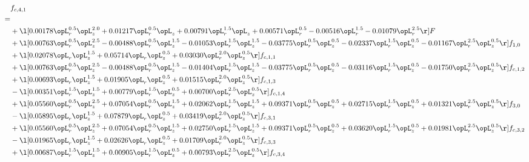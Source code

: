 \begin{alignat}{2} 
\label{eq:f_41_1} 
& f_{c,4,1} \nonumber \\ 
 = \\ 
& + \l[  0.00178 \opL_r^{0.5} \opL_z^{2.0} +  0.01217 \opL_r^{0.5} \opL_z +  0.00791 \opL_r^{1.5} \opL_z +  0.00571 \opL_r^{0.5}   -0.00516 \opL_r^{1.5}   -0.01079 \opL_r^{2.5}  \r] F \nonumber \\ 
& + \l[  0.00763 \opL_r^{0.5} \opL_z^{2.5}   -0.00488 \opL_r^{0.5} \opL_z^{1.5}   -0.01053 \opL_r^{1.5} \opL_z^{1.5}   -0.03775 \opL_r^{0.5} \opL_z^{0.5}   -0.02337 \opL_r^{1.5} \opL_z^{0.5}   -0.01167 \opL_r^{2.5} \opL_z^{0.5}  \r] f_{1,0} \nonumber \\ 
& + \l[  0.02078 \opL_r \opL_z^{1.5} +  0.05714 \opL_r \opL_z^{0.5} +  0.03030 \opL_r^{2.0} \opL_z^{0.5}  \r] f_{c,1,1} \nonumber \\ 
& + \l[  0.00763 \opL_r^{0.5} \opL_z^{2.5}   -0.00488 \opL_r^{0.5} \opL_z^{1.5}   -0.01404 \opL_r^{1.5} \opL_z^{1.5}   -0.03775 \opL_r^{0.5} \opL_z^{0.5}   -0.03116 \opL_r^{1.5} \opL_z^{0.5}   -0.01750 \opL_r^{2.5} \opL_z^{0.5}  \r] f_{c,1,2} \nonumber \\ 
& + \l[  0.00693 \opL_r \opL_z^{1.5} +  0.01905 \opL_r \opL_z^{0.5} +  0.01515 \opL_r^{2.0} \opL_z^{0.5}  \r] f_{c,1,3} \nonumber \\ 
& - \l[  0.00351 \opL_r^{1.5} \opL_z^{1.5} +  0.00779 \opL_r^{1.5} \opL_z^{0.5} +  0.00700 \opL_r^{2.5} \opL_z^{0.5}  \r] f_{c,1,4} \nonumber \\ 
& + \l[  0.05560 \opL_r^{0.5} \opL_z^{2.5} +  0.07054 \opL_r^{0.5} \opL_z^{1.5} +  0.02062 \opL_r^{1.5} \opL_z^{1.5} +  0.09371 \opL_r^{0.5} \opL_z^{0.5} +  0.02715 \opL_r^{1.5} \opL_z^{0.5} +  0.01321 \opL_r^{2.5} \opL_z^{0.5}  \r] f_{3,0} \nonumber \\ 
& - \l[  0.05895 \opL_r \opL_z^{1.5} +  0.07879 \opL_r \opL_z^{0.5} +  0.03419 \opL_r^{2.0} \opL_z^{0.5}  \r] f_{c,3,1} \nonumber \\ 
& + \l[  0.05560 \opL_r^{0.5} \opL_z^{2.5} +  0.07054 \opL_r^{0.5} \opL_z^{1.5} +  0.02750 \opL_r^{1.5} \opL_z^{1.5} +  0.09371 \opL_r^{0.5} \opL_z^{0.5} +  0.03620 \opL_r^{1.5} \opL_z^{0.5} +  0.01981 \opL_r^{2.5} \opL_z^{0.5}  \r] f_{c,3,2} \nonumber \\ 
& - \l[  0.01965 \opL_r \opL_z^{1.5} +  0.02626 \opL_r \opL_z^{0.5} +  0.01709 \opL_r^{2.0} \opL_z^{0.5}  \r] f_{c,3,3} \nonumber \\ 
& + \l[  0.00687 \opL_r^{1.5} \opL_z^{1.5} +  0.00905 \opL_r^{1.5} \opL_z^{0.5} +  0.00793 \opL_r^{2.5} \opL_z^{0.5}  \r] f_{c,3,4} \nonumber \\ 

\end{alignat}
